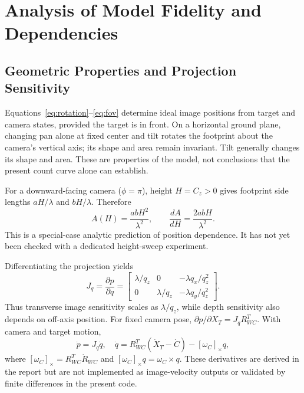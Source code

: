\documentclass[11pt,letterpaper]{article}
\begin{document}
\section{Analysis of Model Fidelity and Dependencies}
\label{sec:analysis}

\subsection{Geometric Properties and Projection Sensitivity}
Equations~\eqref{eq:rotation}--\eqref{eq:fov} determine ideal image positions from target and camera states, provided the target is in front. On a horizontal ground plane, changing pan alone at fixed center and tilt rotates the footprint about the camera's vertical axis; its shape and area remain invariant. Tilt generally changes its shape and area. These are properties of the model, not conclusions that the present count curve alone can establish.

For a downward-facing camera ($\phi=\pi$), height $H=C_z>0$ gives footprint side lengths $aH/\lambda$ and $bH/\lambda$. Therefore
\begin{equation}
A(H)=\frac{abH^2}{\lambda^2},\qquad \frac{dA}{dH}=\frac{2abH}{\lambda^2}.
\label{eq:area}
\end{equation}
This is a special-case analytic prediction of position dependence. It has not yet been checked with a dedicated height-sweep experiment.

Differentiating the projection yields
\begin{equation}
J_q=\frac{\partial p}{\partial q}=\begin{bmatrix}
\lambda/q_z&0&-\lambda q_x/q_z^2\\
0&\lambda/q_z&-\lambda q_y/q_z^2
\end{bmatrix}.
\label{eq:jacobian}
\end{equation}
Thus transverse image sensitivity scales as $\lambda/q_z$, while depth sensitivity also depends on off-axis position. For fixed camera pose, $\partial p/\partial X_T=J_qR_{WC}^T$. With camera and target motion,
\begin{equation}
\dot p=J_q\dot q,\quad
\dot q=R_{WC}^T(\dot X_T-\dot C)-[\omega_C]_\times q,
\end{equation}
where $[\omega_C]_\times=R_{WC}^T\dot R_{WC}$ and $[\omega_C]_\times q=\omega_C\times q$. These derivatives are derived in the report but are not implemented as image-velocity outputs or validated by finite differences in the present code.
\end{document}
